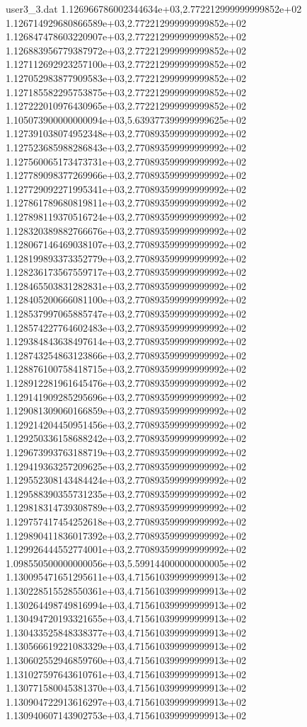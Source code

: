 \begin{filecontents}{user3_3.dat}
1.126966786002344634e+03,2.772212999999999852e+02
1.126714929680866589e+03,2.772212999999999852e+02
1.126847478603220907e+03,2.772212999999999852e+02
1.126883956779387972e+03,2.772212999999999852e+02
1.127112692923257100e+03,2.772212999999999852e+02
1.127052983877909583e+03,2.772212999999999852e+02
1.127185582295753875e+03,2.772212999999999852e+02
1.127222010976430965e+03,2.772212999999999852e+02
1.105073900000000094e+03,5.639377399999999625e+02
1.127391038074952348e+03,2.770893599999999992e+02
1.127523685988286843e+03,2.770893599999999992e+02
1.127560065173473731e+03,2.770893599999999992e+02
1.127789098377269966e+03,2.770893599999999992e+02
1.127729092271995341e+03,2.770893599999999992e+02
1.127861789680819811e+03,2.770893599999999992e+02
1.127898119370516724e+03,2.770893599999999992e+02
1.128320389882766676e+03,2.770893599999999992e+02
1.128067146469038107e+03,2.770893599999999992e+02
1.128199893373352779e+03,2.770893599999999992e+02
1.128236173567559717e+03,2.770893599999999992e+02
1.128465503831282831e+03,2.770893599999999992e+02
1.128405200666081100e+03,2.770893599999999992e+02
1.128537997065885747e+03,2.770893599999999992e+02
1.128574227764602483e+03,2.770893599999999992e+02
1.129384843638497614e+03,2.770893599999999992e+02
1.128743254863123866e+03,2.770893599999999992e+02
1.128876100758418715e+03,2.770893599999999992e+02
1.128912281961645476e+03,2.770893599999999992e+02
1.129141909285295696e+03,2.770893599999999992e+02
1.129081309060166859e+03,2.770893599999999992e+02
1.129214204450951456e+03,2.770893599999999992e+02
1.129250336158688242e+03,2.770893599999999992e+02
1.129673993763188719e+03,2.770893599999999992e+02
1.129419363257209625e+03,2.770893599999999992e+02
1.129552308143484424e+03,2.770893599999999992e+02
1.129588390355731235e+03,2.770893599999999992e+02
1.129818314739308789e+03,2.770893599999999992e+02
1.129757417454252618e+03,2.770893599999999992e+02
1.129890411836017392e+03,2.770893599999999992e+02
1.129926444552774001e+03,2.770893599999999992e+02
1.098550500000000056e+03,5.599144000000000005e+02
1.130095471651295611e+03,4.715610399999999913e+02
1.130228515528550361e+03,4.715610399999999913e+02
1.130264498749816994e+03,4.715610399999999913e+02
1.130494720193321655e+03,4.715610399999999913e+02
1.130433525848338377e+03,4.715610399999999913e+02
1.130566619221083329e+03,4.715610399999999913e+02
1.130602552946859760e+03,4.715610399999999913e+02
1.131027597643610761e+03,4.715610399999999913e+02
1.130771580045381370e+03,4.715610399999999913e+02
1.130904722913616297e+03,4.715610399999999913e+02
1.130940607143902753e+03,4.715610399999999913e+02

\end{filecontents}
